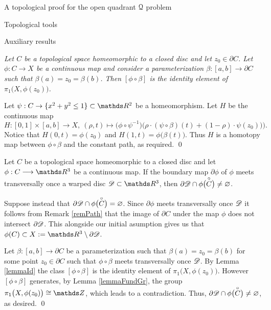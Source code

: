 \documentclass[11pt, a4paper, english, twoside, notitlepage, openright]{report}
\begin{document}
\begin{chapter}{A topological proof for the open quadrant $\mathcal{Q}$ problem}
\begin{section}{Topological tools}
\begin{subsection}{Auxiliary results}
\begin{lemma}\label{lemmaId} \em Let $C$ be a topological space homeomorphic to a closed disc and let $z_0\in\partial C$. Let $\phi:C\longrightarrow X$ be a continuous map and consider a parameterization $\beta:[a,b]\to\partial C$ such that $\beta(a)=z_0=\beta(b)$. Then $[\phi\circ\beta]$ is the identity element of $\pi_1\big(X,\phi(z_0)\big)$.\em
\begin{Proof} 
Let $\psi:C\to\{x^2+y^2\leq 1\}\subset\R^2$ be a homeomorphism. Let $H$ be the continuous map
$$
H:[0,1]\times[a,b]\to X,\ (\rho,t)\mapsto\big(\phi\circ\psi^{-1}\big)\big(\rho\cdot(\psi\circ\beta)(t)+(1-\rho)\cdot\psi(z_0))\big).
$$
Notice that $H(0,t)=\phi(z_0)$ and $H(1,t)=\phi\big(\beta(t)\big)$. Thus $H$ is a homotopy map between $\phi\circ\beta$ and the constant path, as required.
\qed
\end{Proof}
\end{lemma}

\begin{proposition}\label{propTop}
Let $C$ be a topological space homeomorphic to a closed disc and let $\phi:C\longrightarrow\R^3$ be a continuous map. If the boundary map $\partial\phi$ of $\phi$ meets transversally once a warped disc $\D\subset\R^3$, then $\partial\mathscr{D}\cap\phi\big(\overset{\circ}{C}\big)\neq\varnothing$.
\begin{Proof}
Suppose instead that $\partial\mathscr{D}\cap\phi\big(\overset{\circ}{C}\big)=\varnothing$. Since $\partial\phi$ meets transversally once $\mathscr{D}$ it follows from Remark \ref{remPath} that the image of $\partial C$ under the map $\phi$ does not intersect $\partial\mathscr{D}$. This alongside our initial asumption gives us that $\phi(C)\subset X:=\R^3\setminus\partial\D$.

\vspace{1mm}

Let $\beta:[a,b]\to\partial C$ be a parameterization such that $\beta(a)=z_0=\beta(b)$ for some point $z_0\in\partial C$ such that $\phi\circ\beta$ meets transversally once $\mathscr{D}$. By Lemma \ref{lemmaId} the class $[\phi\circ\beta]$ is the identity element of $\pi_1\big(X,\phi(z_0)\big)$. However $[\phi\circ\beta]$ generates, by Lemma \ref{lemmaFundGr}, the group $\pi_1\big(X,\phi(z_0)\big)\cong\Z$, which leads to a contradiction. Thus, $\partial\mathscr{D}\cap\phi\big(\overset{\circ}{C}\big)\neq\varnothing$, as desired.
\qed
\end{Proof}
\end{proposition}
\end{subsection}
\end{section}


\end{chapter}
\end{document}
